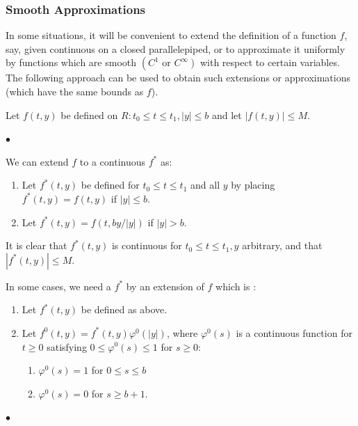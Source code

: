 \documentclass{article}
\begin{document}
 \subsubsection{Smooth Approximations}\label{sec:smooth_app}
In some situations, it will be convenient to extend the definition of a function $f$, say, given continuous on a closed parallelepiped, or to approximate it uniformly by functions which are smooth $\left(C^{1}\right.$ or $\left.C^{\infty}\right)$ with respect to certain variables. The following approach can be used to obtain such extensions or approximations (which have the same bounds as $f$).

Let $f(t, y)$ be defined on $R: t_{0} \le t \le t_{1},|y| \le b$ and let $|f(t, y)| \le M$.

$\bullet$ 

 We can extend $f$ to a continuous $f^*$ as: 
\begin{enumerate}
    \item Let $f^{*}(t, y)$ be defined for $t_{0} \le t \le t_{1}$ and all $y$ by placing $f^{*}(t, y)=f(t, y)$ if $|y| \le b$.
    \item Let $f^{*}(t, y)=f(t, b y/ |y|)$ if $|y|>b$.
\end{enumerate} It is clear that $f^{*}(t, y)$ is continuous for $t_{0} \le t \le t_{1}, y$ arbitrary, and that $\left|f^{*}(t, y)\right| \le M .$ 

 In some cases, we need a $f^{*}$ by an extension of $f$ which is :
\begin{enumerate}
    \item  Let $f^{*}(t, y)$ be defined as above.
    \item Let $f^{0}(t, y)=f^{*}(t, y) \varphi^{0}(|y|)$, where $\varphi^{0}(s)$ is a continuous function for $t \ge 0$ satisfying $0 \le \varphi^{0}(s) \le 1$ for $s \ge 0$: 
    \begin{enumerate}
        \item $\varphi^{0}(s)=1$ for $0 \le s \le b$
        \item $\varphi^{0}(s)=0$ for $s \ge b+1 .$
    \end{enumerate}
\end{enumerate}

$\bullet$ 
\end{document}

